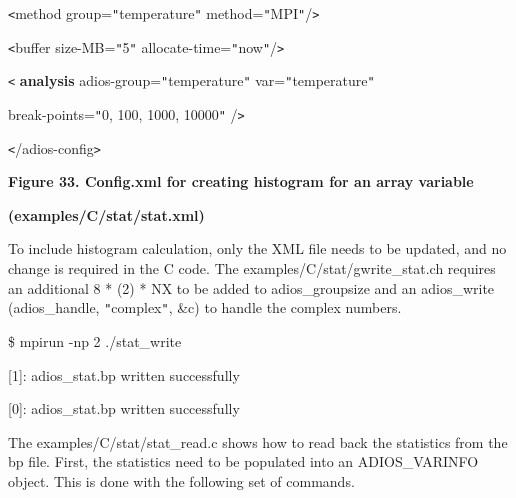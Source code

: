 \vspace{23pt}
\parindent=0pt
\texttt{<}method group=\texttt{"}temperature\texttt{"} method=\texttt{"}MPI\texttt{"}/\texttt{>}

\vspace{10pt}
\texttt{<}buffer size-MB=\texttt{"}5\texttt{"} allocate-time=\texttt{"}now\texttt{"}/\texttt{>}

\vspace{10pt}
{\color{color02} \texttt{<}}{\color{color02} \textbf{analysis}}{\color{color02}  
adios-group=\texttt{"}temperature\texttt{"} var=\texttt{"}temperature\texttt{"}}

\vspace{10pt}
{\color{color02} break-points=\texttt{"}0, 100, 1000, 10000\texttt{"} /\texttt{>}}

\vspace{10pt}
\texttt{<}/adios-config\texttt{>}

\label{HToc144350192}

\vspace{23pt}
\begin{center}
{\color{color20} \textbf{Figure 33. Config.xml for creating histogram for an array 
variable}}

\vspace{10pt}
{\color{color20} \textbf{(examples/C/stat/stat.xml)}}
\end{center}

\vspace{23pt}
To include histogram calculation, only the XML file needs to be updated, and no 
change is required in the C code. The examples/C/stat/gwrite\_stat.ch requires 
an additional {\color{color02} 8 * (2) * NX} to be added to adios\_groupsize and 
an adios\_write (adios\_handle, \texttt{"}complex\texttt{"}, \&c) to handle the 
complex numbers.

\vspace{10pt}
\$ mpirun -np 2 ./stat\_write

\vspace{10pt}
[1]: adios\_stat.bp written successfully

\vspace{10pt}
[0]: adios\_stat.bp written successfully

\vspace{23pt}
The examples/C/stat/stat\_read.c shows how to read back the statistics from the 
bp file. First, the statistics need to be populated into an ADIOS\_VARINFO object. 
This is done with the following set of commands.

